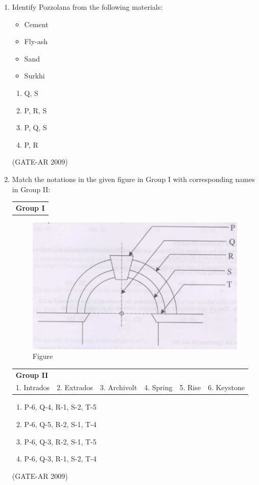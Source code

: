 \documentclass[a4paper,10pt]{article}
\begin{document}
\begin{enumerate}
    \item Identify Pozzolana from the following materials: 
    \begin{itemize}
        \item Cement
        \item Fly-ash
        \item Sand
        \item Surkhi
    \end{itemize}
    \begin{multicols}{2}
	\begin{enumerate}
        \item Q, S
        \item P, R, S
        \item P, Q, S
        \item P, R
    \end{enumerate}
	\end{multicols}
    \hfill (GATE-AR 2009)

	\item Match the notations in the given figure in Group I with corresponding names in Group II:  \\
    \begin{tabular}{ l }
	\textbf{Group I} \\
	\end{tabular}
	\begin{figure}[h!]
        \centering
        \includegraphics[width=0.5\linewidth]{figs/04.jpg}
	\caption{Figure}
	\label{fig:Img04}
	\end{figure}
    \begin{tabular}{ l l l l l l }
	\textbf{Group II} & & & & & \\
	1. Intrados & 2. Extrados & 3. Archivolt & 4. Spring & 5. Rise & 6. Keystone \\
	\end{tabular}	
	\begin{enumerate}
        \item P-6, Q-4, R-1, S-2, T-5
        \item P-6, Q-5, R-2, S-1, T-4
        \item P-6, Q-3, R-2, S-1, T-5
        \item P-6, Q-3, R-1, S-2, T-4
    \end{enumerate}
    \hfill (GATE-AR 2009)


\end{enumerate}
\end{document}
